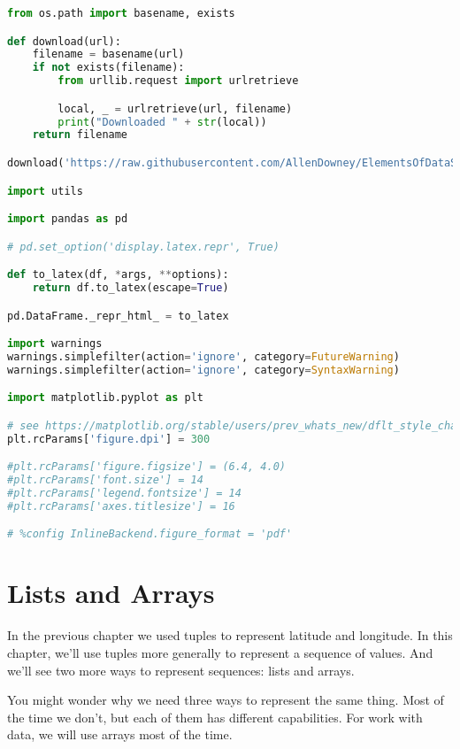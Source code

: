 \documentclass[
]{book}
\author{}
\date{}
\begin{document}
\frontmatter

\mainmatter
\begin{lstlisting}[language=Python]
from os.path import basename, exists

def download(url):
    filename = basename(url)
    if not exists(filename):
        from urllib.request import urlretrieve

        local, _ = urlretrieve(url, filename)
        print("Downloaded " + str(local))
    return filename

download('https://raw.githubusercontent.com/AllenDowney/ElementsOfDataScience/v1/utils.py')

import utils

import pandas as pd

# pd.set_option('display.latex.repr', True)

def to_latex(df, *args, **options):
    return df.to_latex(escape=True)

pd.DataFrame._repr_html_ = to_latex

import warnings
warnings.simplefilter(action='ignore', category=FutureWarning)
warnings.simplefilter(action='ignore', category=SyntaxWarning)

import matplotlib.pyplot as plt

# see https://matplotlib.org/stable/users/prev_whats_new/dflt_style_changes.html#figure-size-font-size-and-screen-dpi
plt.rcParams['figure.dpi'] = 300

#plt.rcParams['figure.figsize'] = (6.4, 4.0)
#plt.rcParams['font.size'] = 14
#plt.rcParams['legend.fontsize'] = 14
#plt.rcParams['axes.titlesize'] = 16

# %config InlineBackend.figure_format = 'pdf'
\end{lstlisting}

\chapter{Lists and Arrays}\label{lists-and-arrays}

In the previous chapter we used tuples to represent latitude and
longitude. In this chapter, we'll use tuples more generally to represent
a sequence of values. And we'll see two more ways to represent
sequences: lists and arrays.

You might wonder why we need three ways to represent the same thing.
Most of the time we don't, but each of them has different capabilities.
For work with data, we will use arrays most of the time.
\end{document}
